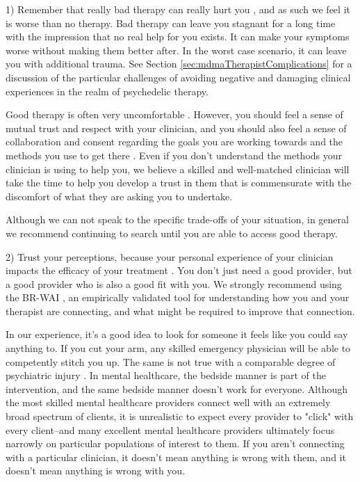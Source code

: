 \documentclass[12pt,letterpaper]{book}
\begin{document}
1) Remember that really bad therapy can really hurt you \cite{hook2018boundary}, and as such we feel it is worse than no therapy. Bad therapy can leave you stagnant for a long time with the impression that no real help for you exists. It can make your symptoms worse without making them better after. In the worst case scenario, it can leave you with additional trauma. See Section \ref{sec:mdmaTherapistComplications} for a discussion of the particular challenges of avoiding negative and damaging clinical experiences in the realm of psychedelic therapy.

Good therapy is often very uncomfortable \cite{eckerUnlocking}. However, you should feel a sense of mutual trust and respect with your clinician, and you should also feel a sense of collaboration and consent regarding the goals you are working towards and the methods you use to get there \cite{BRWAIdownload}. Even if you don't understand the methods your clinician is using to help you, we believe a skilled and well-matched clinician will take the time to help you develop a trust in them that is commensurate with the discomfort of what they are asking you to undertake.

Although we can not speak to the specific trade-offs of your situation, in general we recommend continuing to search until you are able to access good therapy.

2) Trust your perceptions, because your personal experience of your clinician impacts the efficacy of your treatment \cite{horvath2011alliance}. You don't just need a good provider, but a good provider who is also a good fit with you. We strongly recommend using the BR-WAI \cite{BRWAIdownload}, an empirically validated tool for understanding how you and your therapist are connecting, and what might be required to improve that connection.

In our experience, it's a good idea to look for someone it feels like you could say anything to. If you cut your arm, any skilled emergency physician will be able to competently stitch you up. The same is not true with a comparable degree of psychiatric injury \cite{firth2019therapistEffects}. In mental healthcare, the bedside manner is part of the intervention, and the same bedside manner doesn't work for everyone. Although the most skilled mental healthcare providers connect well with an extremely broad spectrum of clients, it is unrealistic to expect every provider to "click" with every client--and many excellent mental healthcare providers ultimately focus narrowly on particular populations of interest to them. If you aren't connecting with a particular clinician, it doesn't mean anything is wrong with them, and it doesn't mean anything is wrong with you.
\end{document}
